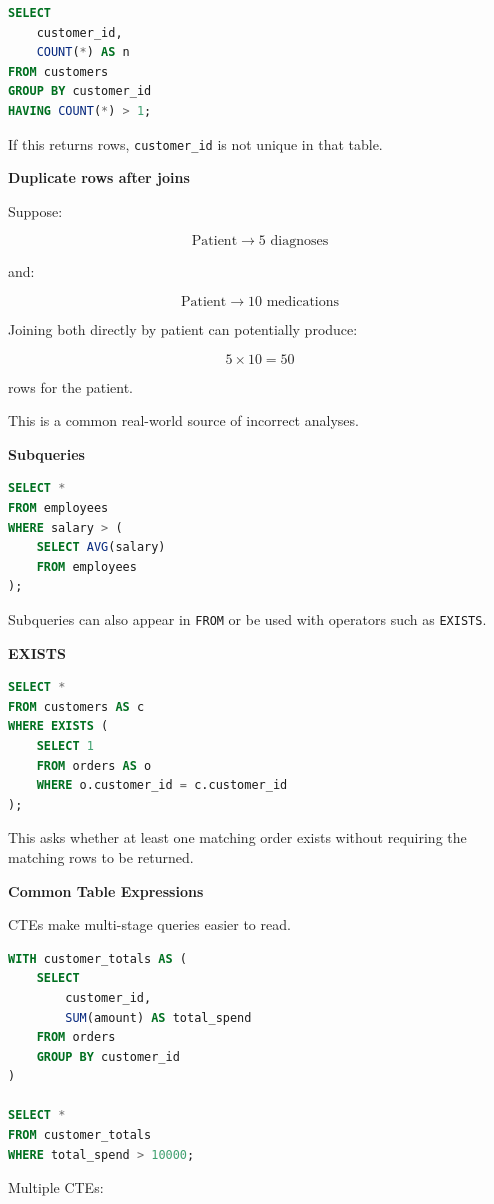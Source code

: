 \documentclass[11pt,letterpaper]{article}
\begin{document}
\begin{lstlisting}[language=SQL]
SELECT
    customer_id,
    COUNT(*) AS n
FROM customers
GROUP BY customer_id
HAVING COUNT(*) > 1;
\end{lstlisting}

If this returns rows, \texttt{customer\_id} is not unique in that table.

\textbf{Duplicate rows after joins}

Suppose:

\[
\text{Patient}
\rightarrow
5\text{ diagnoses}
\]

and:

\[
\text{Patient}
\rightarrow
10\text{ medications}
\]

Joining both directly by patient can potentially produce:

\[
5 \times 10 = 50
\]

rows for the patient.

This is a common real-world source of incorrect analyses.

\textbf{Subqueries}

\begin{lstlisting}[language=SQL]
SELECT *
FROM employees
WHERE salary > (
    SELECT AVG(salary)
    FROM employees
);
\end{lstlisting}

Subqueries can also appear in \texttt{FROM} or be used with operators such as
\texttt{EXISTS}.

\textbf{EXISTS}

\begin{lstlisting}[language=SQL]
SELECT *
FROM customers AS c
WHERE EXISTS (
    SELECT 1
    FROM orders AS o
    WHERE o.customer_id = c.customer_id
);
\end{lstlisting}

This asks whether at least one matching order exists without requiring the
matching rows to be returned.

\textbf{Common Table Expressions}

CTEs make multi-stage queries easier to read.

\begin{lstlisting}[language=SQL]
WITH customer_totals AS (
    SELECT
        customer_id,
        SUM(amount) AS total_spend
    FROM orders
    GROUP BY customer_id
)

SELECT *
FROM customer_totals
WHERE total_spend > 10000;
\end{lstlisting}

Multiple CTEs:
\end{document}
